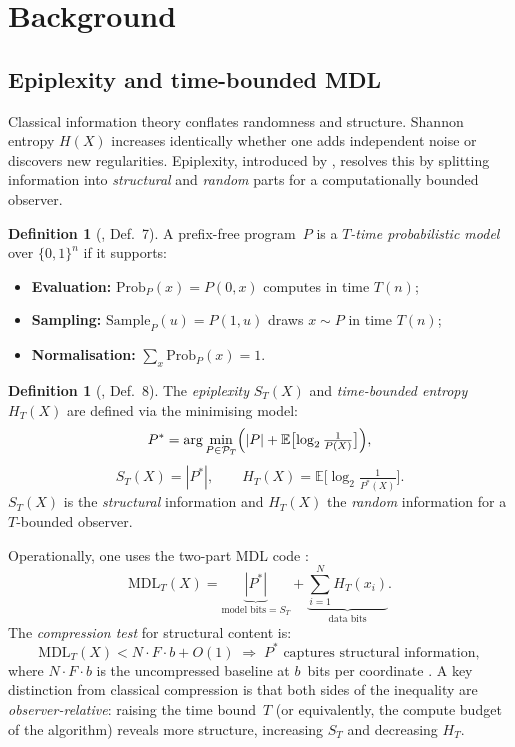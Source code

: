 \documentclass[12pt,a4paper]{article}
\theoremstyle{plain}
\theoremstyle{definition}
\newtheorem{definition}[theorem]{Definition}
\theoremstyle{remark}
\newcommand{\E}{\mathbb{E}}
\newcommand{\1}{\mathbf{1}}
\begin{document}
	\section{Background}
	\label{sec:background}
	
	\subsection{Epiplexity and time-bounded MDL}
	
	Classical information theory conflates randomness and structure.
	Shannon entropy $H(X)$ increases identically whether one adds
	independent noise or discovers new regularities.
	Epiplexity, introduced by \cite{finzi2026epiplexity}, resolves this
	by splitting information into \emph{structural} and \emph{random} parts
	for a computationally bounded observer.
	
	\begin{definition}[\cite{finzi2026epiplexity}, Def.\ 7]
		A prefix-free program~$P$ is a \emph{$T$-time probabilistic model} over
		$\{0,1\}^n$ if it supports:
		\begin{itemize}
			\item \textbf{Evaluation:} $\mathrm{Prob}_P(x) = P(0, x)$ computes
			in time $T(n)$;
			\item \textbf{Sampling:} $\mathrm{Sample}_P(u) = P(1, u)$ draws
			$x\sim P$ in time $T(n)$;
			\item \textbf{Normalisation:} $\sum_{x}\mathrm{Prob}_P(x)=1$.
		\end{itemize}
	\end{definition}
	
	\begin{definition}[\cite{finzi2026epiplexity}, Def.\ 8]
		The \emph{epiplexity} $S_T(X)$ and \emph{time-bounded entropy}
		$H_T(X)$ are defined via the minimising model:
		\[
		P^* = \arg\min_{P\in\mathcal{P}_T}
		\Bigl(|P| + \E\bigl[\log_2\tfrac{1}{P(X)}\bigr]\Bigr),
		\]
		\[
		S_T(X) = |P^*|, \qquad
		H_T(X) = \E\bigl[\log_2\tfrac{1}{P^*(X)}\bigr].
		\]
		$S_T(X)$ is the \emph{structural} information and $H_T(X)$ the
		\emph{random} information for a $T$-bounded observer.
	\end{definition}
	
	Operationally, one uses the two-part MDL code \citep{GrunwaldMDL,
		VitanyiMDL}:
	\begin{equation}
		\label{eq:mdl}
		\mathrm{MDL}_T(X)
		= \underbrace{|P^*|}_{\text{model bits}=S_T}
		+ \underbrace{\sum_{i=1}^{N} H_T(x_i)}_{\text{data bits}}.
	\end{equation}
	The \emph{compression test} for structural content is:
	\[
	\mathrm{MDL}_T(X) < N\cdot F\cdot b + O(1)
	\;\Longrightarrow\;
	P^*\text{ captures structural information},
	\]
	where $N\cdot F\cdot b$ is the uncompressed baseline at $b$~bits per
	coordinate \citep{VitanyiStructureFunction}.
	A key distinction from classical compression is that both sides of the
	inequality are \emph{observer-relative}: raising the time bound~$T$
	(or equivalently, the compute budget of the algorithm) reveals more
	structure, increasing $S_T$ and decreasing $H_T$.
	
\end{document}
